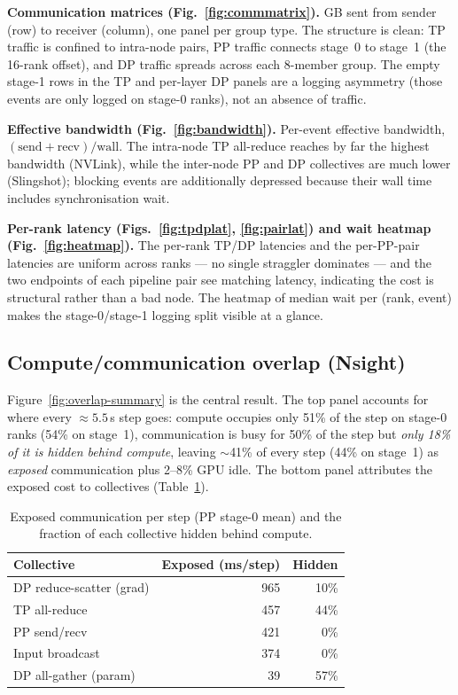 \noindent\textbf{Communication matrices (Fig.~\ref{fig:commmatrix}).}
GB sent from sender (row) to receiver (column), one panel per group type.
The structure is clean: TP traffic is confined to intra-node pairs, PP
traffic connects stage~0 to stage~1 (the 16-rank offset), and DP traffic
spreads across each 8-member group. The empty stage-1 rows in the TP and
per-layer DP panels are a logging asymmetry (those events are only logged
on stage-0 ranks), not an absence of traffic.

\noindent\textbf{Effective bandwidth (Fig.~\ref{fig:bandwidth}).}
Per-event effective bandwidth, $(\text{send}+\text{recv})/\text{wall}$.
The intra-node TP all-reduce reaches by far the highest bandwidth
(NVLink), while the inter-node PP and DP collectives are much lower
(Slingshot); blocking events are additionally depressed because their
wall time includes synchronisation wait.

\noindent\textbf{Per-rank latency (Figs.~\ref{fig:tpdplat},
\ref{fig:pairlat}) and wait heatmap (Fig.~\ref{fig:heatmap}).}
The per-rank TP/DP latencies and the per-PP-pair latencies are uniform
across ranks --- no single straggler dominates --- and the two endpoints
of each pipeline pair see matching latency, indicating the cost is
structural rather than a bad node. The heatmap of median wait per
(rank, event) makes the stage-0/stage-1 logging split visible at a
glance.

\subsection{Compute/communication overlap (Nsight)}

Figure~\ref{fig:overlap-summary} is the central result. The top panel
accounts for where every $\approx 5.5$\,s step goes: compute occupies
only 51\% of the step on stage-0 ranks (54\% on stage~1), communication
is busy for 50\% of the step but \emph{only 18\% of it is hidden behind
compute}, leaving $\sim$41\% of every step (44\% on stage~1) as
\emph{exposed} communication plus 2--8\% GPU idle. The bottom panel
attributes the exposed cost to collectives (Table~\ref{tab:exposed}).

\begin{table}[t]
  \centering
  \caption{Exposed communication per step (PP stage-0 mean) and the
    fraction of each collective hidden behind compute.}
  \label{tab:exposed}
  \begin{tabular}{lrr}
    \toprule
    Collective & Exposed (ms/step) & Hidden \\
    \midrule
    DP reduce-scatter (grad) & 965 & 10\% \\
    TP all-reduce            & 457 & 44\% \\
    PP send/recv             & 421 & 0\%  \\
    Input broadcast          & 374 & 0\%  \\
    DP all-gather (param)    & 39  & 57\% \\
    \bottomrule
  \end{tabular}
\end{table}

